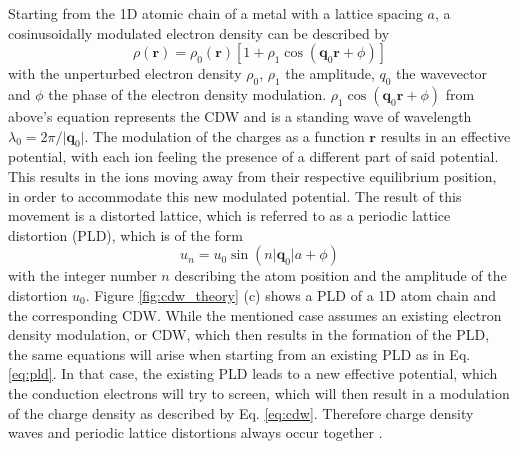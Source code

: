 Starting from the 1D atomic chain of a metal with a lattice spacing $a$, a cosinusoidally modulated electron density can be described by
\begin{equation}
	\rho(\mathbf{r}) = \rho_0(\mathbf{r})[1+\rho_1 \cos(\mathbf{q}_0\mathbf{r}+\phi)]
	\label{eq:cdw}
\end{equation}
with the unperturbed electron density $\rho_0$, $\rho_1$ the amplitude, $q_0$ the wavevector and $\phi$ the phase of the electron density modulation.
$\rho_1 \cos(\mathbf{q}_0\mathbf{r}+\phi)$ from above's equation represents the CDW and is a standing wave of wavelength $\lambda_0 = 2\pi/\lvert \mathbf{q}_0\rvert$.
The modulation of the charges as a function $\mathbf{r}$ results in an effective potential, with each ion feeling the presence of a different part of said potential.
This results in the ions moving away from their respective equilibrium position, in order to accommodate this new modulated potential.
The result of this movement is a distorted lattice, which is referred to as a periodic lattice distortion (PLD), which is of the form
\begin{equation}
	u_n = u_0 \sin(n\lvert \mathbf{q}_0\rvert a+\phi)
	\label{eq:pld}
\end{equation}
with the integer number $n$ describing the atom position and the amplitude of the distortion $u_0$.
Figure \ref{fig:cdw_theory} (c) shows a PLD of a 1D atom chain and the corresponding CDW.
While the mentioned case assumes an existing electron density modulation, or CDW, which then results in the formation of the PLD, the same equations will arise when starting from an existing PLD as in Eq. \ref{eq:pld}.
In that case, the existing PLD leads to a new effective potential, which the conduction electrons will try to screen, which will then result in a modulation of the charge density as described by Eq. \ref{eq:cdw}.
Therefore charge density waves and periodic lattice distortions always occur together \cite{rossnagel_origin_2011, chan_spin_1973, johannes_fermi_2008}.

